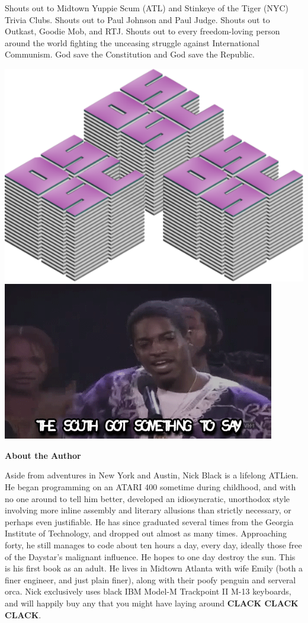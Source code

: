 \documentclass[letterpaper,10pt]{article}
\begin{document}
Shouts out to Midtown Yuppie Scum (ATL) and Stinkeye of the Tiger (NYC) Trivia
Clubs. Shouts out to Paul Johnson and Paul Judge. Shouts out to Outkast, Goodie
Mob, and RTJ. Shouts out to every freedom-loving person around the world
fighting the unceasing struggle against International Communism. God save the
Constitution and God save the Republic.
\vfill
\begin{center}
\includegraphics[width=.4\linewidth]{../common/dsscaw-purp-scaled.png}
\includegraphics[width=.5\linewidth]{../common/south.png}
\end{center}
\cleardoublepage
\vspace*{.5in}
\begin{center}\textbf{About the Author}\end{center}
Aside from adventures in New York and Austin, Nick Black is a lifelong ATLien.
He began programming on an ATARI 400 sometime during childhood, and with no one
around to tell him better, developed an idiosyncratic, unorthodox style
involving more inline assembly and literary allusions than strictly
necessary, or perhaps even justifiable. He has since graduated several times
from the Georgia Institute of Technology, and dropped out almost as many times.
Approaching forty, he still manages to code about ten hours a day, every day,
ideally those free of the Daystar's malignant influence. He hopes to one day
destroy the sun. This is his first book as an adult. He lives in Midtown
Atlanta with wife Emily (both a finer engineer, and just plain finer),
along with their poofy penguin and serveral orca. Nick exclusively uses black
IBM Model-M Trackpoint II M-13 keyboards, and will happily buy any that you
might have laying around \textbf{CLACK CLACK CLACK}.
\end{document}

